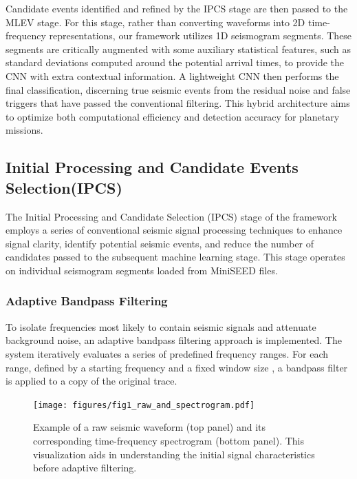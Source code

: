 \documentclass[conference]{IEEEtran}
\begin{document}
Candidate events identified and refined by the IPCS stage are then passed to the MLEV stage. For this stage, rather than
converting waveforms into 2D time-frequency representations, our framework utilizes 1D seismogram segments. These
segments are critically augmented with some auxiliary statistical features, such as standard deviations computed around
the potential arrival times, to provide the CNN with extra contextual information. A lightweight CNN then performs the
final classification, discerning true seismic events from the residual noise and false triggers that have passed the
conventional filtering. This hybrid architecture aims to optimize both computational efficiency and detection accuracy
for planetary missions.
    
    \subsection{Initial Processing and Candidate Events Selection(IPCS)}
    \label{sec:ipcs}
        The Initial Processing and Candidate Selection (IPCS) stage of the framework employs a series of conventional
        seismic signal processing techniques to enhance signal clarity, identify potential seismic events, and reduce
        the number of candidates passed to the subsequent machine learning stage. This stage operates on individual
        seismogram segments loaded from MiniSEED files.
    
        \subsubsection{Adaptive Bandpass Filtering}
            To isolate frequencies most likely to contain seismic signals and attenuate background noise, an adaptive
            bandpass filtering approach is implemented. The system iteratively evaluates a series of predefined
            frequency ranges. For each range, defined by a starting frequency  and a fixed window size , a bandpass
            filter is applied to a copy of the original trace.

            \begin{figure}[htbp]
                \centerline{\texttt{[image: figures/fig1\_raw\_and\_spectrogram.pdf]}}
                \caption{Example of a raw seismic waveform (top panel) and its corresponding time-frequency 
                spectrogram (bottom panel). This visualization aids in understanding the initial signal 
                characteristics before adaptive filtering.}
                \label{fig:raw_spectrogram_example}
            \end{figure}
            
\end{document}
